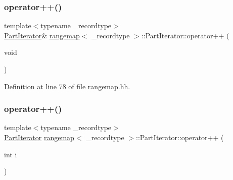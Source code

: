 \mbox{\label{classrangemap_1_1_part_iterator_a129ddc82acbb0258d2077d9a24358097}} 
\subsubsection{\texorpdfstring{operator++()}{operator++()}\hspace{0.1cm}{\footnotesize\ttfamily [1/2]}}
{\footnotesize\ttfamily template$<$typename \+\_\+recordtype$>$ \\
\mbox{\hyperlink{classrangemap_1_1_part_iterator}{Part\+Iterator}}\& \mbox{\hyperlink{classrangemap}{rangemap}}$<$ \+\_\+recordtype $>$\+::Part\+Iterator\+::operator++ (\begin{DoxyParamCaption}\item[{void}]{ }\end{DoxyParamCaption})\hspace{0.3cm}{\ttfamily [inline]}}



Definition at line 78 of file rangemap.\+hh.

\mbox{\label{classrangemap_1_1_part_iterator_a944ca3214a932c15c3ff0f5cd457d517}} 
\subsubsection{\texorpdfstring{operator++()}{operator++()}\hspace{0.1cm}{\footnotesize\ttfamily [2/2]}}
{\footnotesize\ttfamily template$<$typename \+\_\+recordtype$>$ \\
\mbox{\hyperlink{classrangemap_1_1_part_iterator}{Part\+Iterator}} \mbox{\hyperlink{classrangemap}{rangemap}}$<$ \+\_\+recordtype $>$\+::Part\+Iterator\+::operator++ (\begin{DoxyParamCaption}\item[{int}]{i }\end{DoxyParamCaption})\hspace{0.3cm}{\ttfamily [inline]}}



